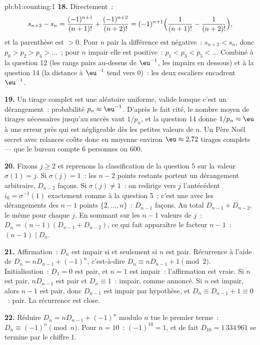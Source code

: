 \begin{solution}{pb:b1:counting:1}
\textbf{18.} Directement~:
\[
s_{n+2} - s_n = \frac{(-1)^{n+1}}{(n+1)!} +
\frac{(-1)^{n+2}}{(n+2)!}
= (-1)^{n+1}\Bigl(\frac1{(n+1)!} - \frac1{(n+2)!}\Bigr),
\]
et la parenthèse est $> 0$. Pour $n$ pair la différence est
négative~: $s_{n+2} < s_n$, donc $p_0 > p_2 > p_4 > \dots$~; pour $n$
impair elle est positive~: $p_1 < p_3 < p_5 < \dots$ Combiné à la
question 12 (les rangs pairs au-dessus de $\eu^{-1}$, les impairs en
dessous) et à la question 14 (la distance à $\eu^{-1}$ tend vers $0$)~:
les deux escaliers encadrent $\eu^{-1}$.

\textbf{19.} Un tirage complet est une  aléatoire uniforme,
valide lorsque c'est un dérangement~: probabilité $p_n \approx \eu^{-1}$.
D'après le fait cité, le nombre moyen de tirages nécessaires jusqu'au
succès vaut $1/p_n$, et la question 14 donne $1/p_n \approx \eu$ à une
erreur près qui est négligeable dès les petites valeurs de $n$. Un Père Noël
secret avec relances coûte donc en moyenne environ $\eu \approx 2{,}72$ tirages
complets --- que le bureau compte $6$ personnes ou $600$.

\textbf{20.} Fixons $j \geq 2$ et reprenons la classification de la
question 5 sur la valeur $\sigma(1) = j$. Si $\sigma(j) = 1$~: les
$n - 2$ points restants portent un dérangement arbitraire, $D_{n-2}$
façons. Si $\sigma(j) \neq 1$~: on redirige vers $j$ l'antécédent
$i_0 = \sigma^{-1}(1)$ exactement comme à la question 5~; c'est une
 avec les dérangements des $n - 1$ points $\{2, \dots, n\}$~:
$D_{n-1}$ façons. Au total $D_{n-1} + D_{n-2}$, le même pour chaque $j$.
En sommant sur les $n - 1$ valeurs de $j$~: $D_n = (n-1)(D_{n-1} + D_{n-2})$,
ce qui fait apparaître le facteur $n - 1$~: $(n-1) \mid D_n$.

\textbf{21.} Affirmation~: $D_n$ est impair si et seulement si $n$ est
pair. Récurrence à l'aide de $D_n = nD_{n-1} + (-1)^n$, c'est-à-dire
$D_n \equiv nD_{n-1} + 1 \pmod 2$. Initialisation~: $D_1 = 0$ est pair,
et $n = 1$ est impair~: l'affirmation est vraie. Si $n$ est pair,
$nD_{n-1}$ est pair et $D_n \equiv 1$~: impair, comme annoncé. Si $n$ est
impair, alors $n - 1$ est pair, donc $D_{n-1}$ est impair par hypothèse, et
$D_n \equiv D_{n-1} + 1 \equiv 0$~: pair. La récurrence est close.

\textbf{22.} Réduire $D_n = nD_{n-1} + (-1)^n$ modulo $n$ tue
le premier terme~: $D_n \equiv (-1)^n \pmod n$. Pour $n = 10$~:
$(-1)^{10} = 1$, et de fait $D_{10} = 1\,334\,961$ se termine par le
chiffre $1$.


\end{solution}
